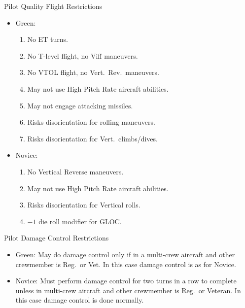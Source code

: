 \begin{table}

\centering

\caption{Pilot Quality Flight Restrictions}
\medskip

\begin{minipage}{1.0\linewidth}
\begin{itemize}[nosep]
    \item Green:
        \begin{enumerate}
            \item No ET turns.
            \item No T-level flight, no Viff maneuvers.
            \item No VTOL flight, no Vert.\ Rev.\ maneuvers.
            \item May not use High Pitch Rate aircraft abilities.
            \item May not engage attacking missiles.
            \item Risks disorientation for rolling maneuvers.
            \item Risks disorientation for Vert.\ climbs/dives.
        \end{enumerate}
    \item Novice:
        \begin{enumerate}
            \item No Vertical Reverse maneuvers.
            \item May not use High Pitch Rate aircraft abilities.
            \item Risks disorientation for Vertical rolls.
            \item $-1$ die roll modifier for GLOC.
        \end{enumerate}
    \end{itemize}
\end{minipage}

\bigskip

\caption{Pilot Damage Control Restrictions}
\medskip

\begin{minipage}{1.0\linewidth}
\begin{itemize}[nosep]
    \item Green: May do damage control only if in a multi-crew aircraft and other crewmember is Reg.\ or Vet. In this case damage control is as for Novice.
    \item Novice: Must perform damage control for two turns in a row to complete unless in multi-crew aircraft and other crewmember is Reg.\ or Veteran. In this case damage control is done normally.
    \end{itemize}
\end{minipage}


\end{table}